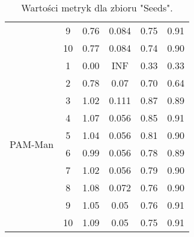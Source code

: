 \begin{table}[H]
\begin{tabular}{cc|cccc}
  & 9 & 0.76 & 0.084 & 0.75 & 0.91 \\ 
  & 10 & 0.77 & 0.084 & 0.74 & 0.90 \\ \hline \hline 
  \multirow{10}{*}{PAM-Man} & 1 & 0.00 & INF & 0.33 & 0.33 \\ 
  & 2 & 0.78 & 0.07 & 0.70 & 0.64 \\ 
  & 3 & 1.02 & 0.111 & 0.87 & 0.89 \\ 
  & 4 & 1.07 & 0.056 & 0.85 & 0.91 \\ 
  & 5 & 1.04 & 0.056 & 0.81 & 0.90 \\ 
  & 6 & 0.99 & 0.056 & 0.78 & 0.89 \\ 
  & 7 & 1.02 & 0.056 & 0.79 & 0.90 \\ 
  & 8 & 1.08 & 0.072 & 0.76 & 0.90 \\ 
  & 9 & 1.05 & 0.05 & 0.76 & 0.91 \\ 
  & 10 & 1.09 & 0.05 & 0.75 & 0.91 \\ 
   \hline
\end{tabular}
  \caption{Wartości metryk dla zbioru "Seeds".}
\end{table}
